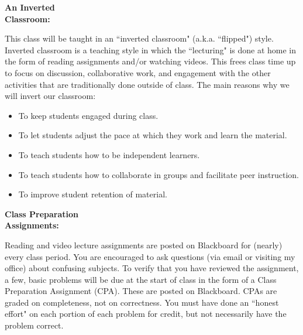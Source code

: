 \documentclass{article}
\theoremstyle{plain}
\theoremstyle{definition}
\theoremstyle{remark}
\begin{document}
\vskip0.2in \noindent
\begin{minipage}[t]{1.3in}
	\textbf{An Inverted} \\ \textbf{Classroom:}
\end{minipage}
\begin{minipage}[t]{5.2in}
	This class will be taught in an ``inverted classroom" (a.k.a. ``flipped") style.  Inverted classroom is a teaching style in which the ``lecturing" is done at home in the form of reading assignments and/or watching videos.  This frees class time up to focus on discussion, collaborative work, and engagement with the other activities that are traditionally done outside of class.
	\vskip0.2in
	The main reasons why we will invert our classroom:
	\begin{itemize}
		\item{To keep students engaged during class.}
		\item{To let students adjust the pace at which they work and learn the material.}
		\item{To teach students how to be independent learners.}
		\item{To teach students how to collaborate in groups and facilitate peer instruction.}
		\item{To improve student retention of material.}
	\end{itemize}
\end{minipage}

\vskip0.2in \noindent
\begin{minipage}[t]{1.3in}
	\textbf{Class Preparation} \\ \textbf{Assignments:}
\end{minipage}
\begin{minipage}[t]{5.2in}
	Reading and video lecture assignments are posted on Blackboard for (nearly) every class period.  You are encouraged to ask questions (via email or visiting my office) about confusing subjects.  To verify that you have reviewed the assignment, a few, basic problems will be due at the start of class in the form of a Class Preparation Assignment (CPA).  These are posted on Blackboard.  CPAs are graded on completeness, not on correctness.  You must have done an ``honest effort" on each portion of each problem for credit, but not necessarily have the problem correct.
\end{minipage}
\end{document}
